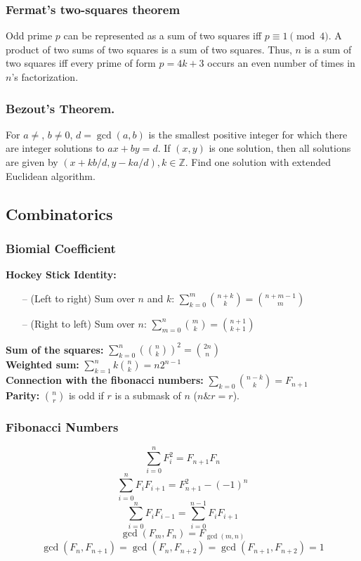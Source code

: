 \begin{small}
\subsubsection{Fermat's two-squares theorem}  Odd prime $p$ can be represented
as a sum of two squares iff $p \equiv 1 {\pmod 4}$.
A product of two sums of two squares is a sum of two squares.
Thus, $n$ is a sum of two squares iff every prime of
form $p=4k+3$ occurs an even number of times in $n$'s factorization.

\subsubsection{Bezout's Theorem.} For $a \neq $, $b \neq 0$,  $d=\gcd(a,b)$ is the smallest positive integer for which there are integer solutions to $ax+by=d$. If $(x,y)$ is one solution, then all solutions are given by $\left(x+kb/d, y-ka/d\right), k\in\mathbb{Z}$. Find one solution with extended Euclidean algorithm.


\subsection{Combinatorics}
  \subsubsection{Biomial Coefficient}
  \textbf{Hockey Stick Identity:}\\
  \begin{itemize}[noitemsep]
    \itemsep0em 
    \item[--] (Left to right) Sum over \( n \) and \( k \): \( \sum_{k = 0}^m \binom{n + k}{k} = \binom{n + m - 1}{m} \)
    \item[--] (Right to left) Sum over \( n \): \( \sum_{m = 0}^n \binom{m}{k} = \binom{n + 1}{k + 1} \)
  \end{itemize}
  \textbf{Sum of the squares:} \( \sum_{k = 0}^n (\binom{n}{k})^2 = \binom{2n}{n} \) \\
  \textbf{Weighted sum:} \( \sum_{k = 1}^n k \binom{n}{k} = n2^{n - 1} \) \\
  \textbf{Connection with the fibonacci numbers:} \( \sum_{k = 0}\binom{n - k}{k} = F_{n + 1} \)\\
  \textbf{Parity:} $\binom{n}{r}$ is odd if $r$ is a submask of $n$ ($n \& r = r$).

  \subsubsection{Fibonacci Numbers}
  $$\sum_{i=0}^n F_i^2=F_{n+1} F_n$$
  $$\sum_{i=0}^n F_i F_{i+1}=F_{n+1}^2-(-1)^n$$
  $$\sum_{i=0}^n F_i F_{i-1}=\sum_{i=0}^{n-1} F_i F_{i+1}$$
  $$\operatorname{gcd}\left(F_m, F_n\right)=F_{\operatorname{gcd}(m, n)}$$
  $$\operatorname{gcd}\left(F_n, F_{n+1}\right)=\operatorname{gcd}\left(F_n, F_{n+2}\right)= \operatorname{gcd}\left(F_{n+1}, F_{n+2}\right)=1$$


\end{small}
